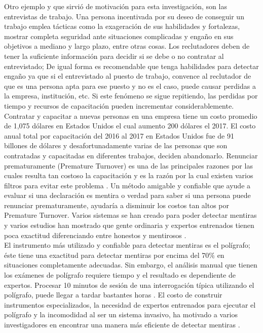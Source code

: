 \begin{onehalfspacing}
Otro ejemplo y que sirvió de motivación para esta investigación, son las entrevistas de trabajo. Una persona incentivada por su deseo de conseguir un trabajo emplea tácticas como la exageración de sus habilidades y fortalezas, mostrar completa seguridad ante situaciones complicadas y engaño en sus objetivos a mediano y largo plazo, entre otras cosas. Los reclutadores deben de tener la suficiente información para decidir si se debe o no contratar al entrevistado; De igual forma es recomendable que tenga habilidades para detectar engaño ya que si el entrevistado al puesto de trabajo, convence al reclutador de que es una persona apta para ese puesto y no es el caso, puede causar perdidas a la empresa, institución, etc. Si este fenómeno se sigue repitiendo, las perdidas por tiempo y recursos de capacitación pueden incrementar considerablemente. Contratar y capacitar a nuevas personas en una empresa tiene un costo promedio de 1,075 dólares en Estados Unidos el cual aumento 200 dólares el 2017. El costo anual total por capacitación del 2016 al 2017 en Estados Unidos fue de 91 billones de dólares y desafortunadamente varias de las personas que son contratadas y capacitadas en diferentes trabajos, deciden abandonarlo. Renunciar prematuramente (Premature Turnover) es una de las principales razones por las cuales resulta tan costoso la capacitación y es la razón por la cual existen varios filtros para evitar este problema \cite{Williams2008IIndustry}. Un método amigable y confiable que ayude a evaluar si una declaración es mentira o verdad para saber si una persona puede renunciar prematuramente, ayudaría a disminuir los costos tan altos por Premature Turnover.
Varios sistemas se han creado para poder detectar mentiras y varios estudios han mostrado que gente ordinaria y expertos entrenados tienen poca exactitud diferenciando entre honestos y mentirosos \cite{Aamondt2006WhoDeception}.\\

El instrumento más utilizado y confiable para detectar mentiras es el polígrafo; éste tiene una exactitud para detectar mentiras por encima del 70\% en situaciones completamente adecuadas. Sin embargo, el análisis manual que tienen los exámenes de polígrafo requiere tiempo y el resultado es dependiente de expertos. Procesar 10 minutos de sesión de una interrogación típica utilizando el polígrafo, puede llegar a tardar bastantes horas \cite{Tsiamyrtzis2005LieVideo}. El costo de construir instrumentos especializados, la necesidad de expertos entrenados para ejecutar el polígrafo y la incomodidad al ser un sistema invasivo, ha motivado a varios investigadores en encontrar una manera más eficiente de detectar mentiras \cite{Lu2012Conventional-or-high-capacity-thickeners-a-better-choice-to-make.pdf,Pollina2006FacialTest}. \\


\end{onehalfspacing}
